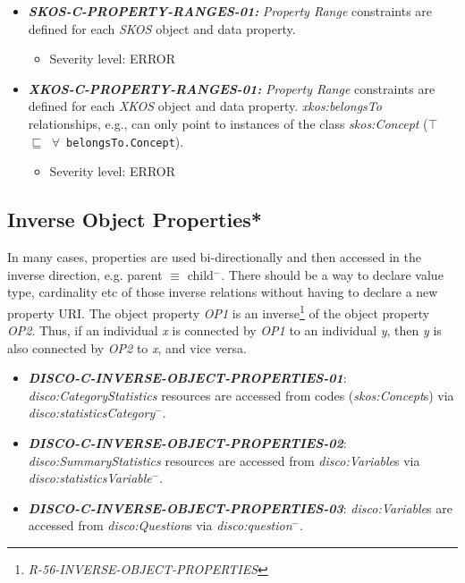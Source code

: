 \documentclass{llncs}
\newcommand{\ms}[1]{\texttt{#1}}
\begin{document}
\begin{itemize}
	\item \textbf{{\em SKOS-C-PROPERTY-RANGES-01:}} 
	{\em Property Range} constraints are defined for each \emph{SKOS} object and data property.
	\begin{itemize}
		\item Severity level: ERROR
	\end{itemize}
\end{itemize}

\begin{itemize}
	\item \textbf{{\em XKOS-C-PROPERTY-RANGES-01:}} 
	{\em Property Range} constraints are defined for each \emph{XKOS} object and data property.
  {\em xkos:belongsTo} relationships, e.g., can only point to instances of the class {\em skos:Concept} (\ms{$\top$ $\sqsubseteq$ $\forall$ belongsTo.Concept}).
	\begin{itemize}
		\item Severity level: ERROR
	\end{itemize}
\end{itemize}

\subsection{Inverse Object Properties*}

In many cases, properties are used bi-directionally and then accessed in the inverse direction, e.g. parent $\equiv$ child$^{-}$. There should be a way to declare value type, cardinality etc of those inverse relations without having to declare a new property URI. 
The object property \emph{OP1} is an inverse\footnote{\emph{R-56-INVERSE-OBJECT-PROPERTIES}} of the object property \emph{OP2}. 
Thus, if an individual \emph{x} is connected by \emph{OP1} to an individual \emph{y}, then \emph{y} is also connected by \emph{OP2} to \emph{x}, and vice versa.

\begin{itemize}
	\item \textbf{{\em DISCO-C-INVERSE-OBJECT-PROPERTIES-01}}:
	\emph{disco:CategoryStatistics} resources are accessed from codes (\emph{skos:Concept}s) via \emph{disco:statisticsCategory}$^{-}$.
	\item \textbf{{\em DISCO-C-INVERSE-OBJECT-PROPERTIES-02}}:
	\emph{disco:SummaryStatistics} resources are accessed from \emph{disco:Variable}s via \emph{disco:statisticsVariable}$^{-}$.
	\item \textbf{{\em DISCO-C-INVERSE-OBJECT-PROPERTIES-03}}:
	\emph{disco:Variable}s are accessed from \emph{disco:Question}s via \emph{disco:question}$^{-}$.
\end{itemize}
\end{document}
